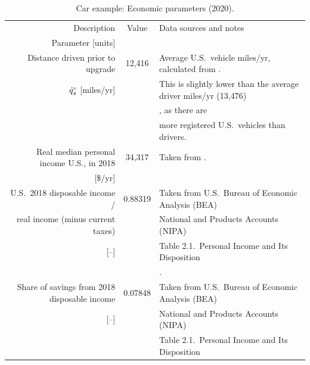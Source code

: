 \documentclass[12pt]{article}\usepackage[]{graphicx}\usepackage[]{xcolor}
\begin{document}
 
\begin{landscape}
\begin{table}
\footnotesize
\begin{center}
\caption{Car example: Economic parameters (2020).}
\label{tab:car_economic_parameters}
\begin{tabular}{ r c l }
  \toprule
  Description & Value & Data sources and notes \\
  Parameter [units] & & \\
  \midrule
  Distance driven prior to upgrade   & 12,416        & Average U.S.\ vehicle miles/yr, calculated from \citet{Car_Insurance:2019}.  \\
  ${}{\dot{q}}^{\scriptscriptstyle \circ}_s$ [miles/yr]                                 &               & This is slightly lower than the average driver miles/yr (13,476) \\
                                                            &               & \citep{US_DoT:2018}, as there are \\
                                                            &               & more registered U.S.\ vehicles than drivers. \\
  \midrule
  Real median personal income U.S., in 2018                 & 34,317        & Taken from \citet{St_Louis_Fed:2019}.\\
  {} [\$/yr]                                                &               & \\
  \midrule
  U.S.\ 2018 disposable income /                            & 0.88319       & Taken from U.S.\ Bureau of Economic Analysis (BEA) \\
  real income (minus current taxes)                         &               & National and Products Accounts (NIPA) \\
  {} [--]                                                   &               & Table 2.1.\ Personal Income and Its Disposition \\
                                                            &               & \citep{US_BEA:2020}. \\
  \midrule
  Share of savings from 2018 disposable income              & 0.07848       & Taken from U.S.\ Bureau of Economic Analysis (BEA) \\
  {} [--]                                                   &               & National and Products Accounts (NIPA) \\
                                                            &               & Table 2.1.\ Personal Income and Its Disposition \\

\end{tabular}
\end{center}
\end{table}
\end{landscape}
\end{document}
